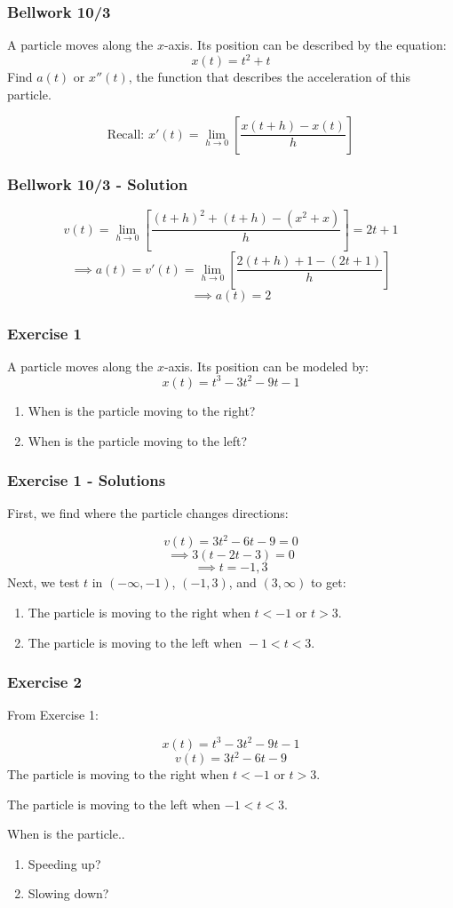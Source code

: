 \documentclass[12pt]{beamer}
\begin{document}
\begin{frame}
	\frametitle{Bellwork 10/3}
	\initclock

	\large
	\vfill
	\vfill
	A particle moves along the $x$-axis. Its position can be described by the equation: \[x(t)=t^2+t\]
	Find $a(t)$ or $x''(t)$, the function that describes the acceleration of this particle.\par
	\vfill
	\[\text{Recall: } x'(t)=\displaystyle\lim_{h\to 0}\left[\frac{x(t+h)-x(t)}{h}\right]\]
	\vfill
	\vfill

	\small
	\crono
\end{frame}
\begin{frame}
	\frametitle{Bellwork 10/3 - Solution}

	\large
	\[v(t)=\displaystyle\lim_{h\to 0}\left[\frac{(t+h)^2+(t+h)-(x^2+x)}{h}\right]=2t+1\]
	\[\implies a(t)=v'(t)=\displaystyle\lim_{h\to 0}\left[\frac{2(t+h)+1-(2t+1)}{h}\right]\]
	\[\implies \boxed{a(t)=2}\]
\end{frame}
\begin{frame}
	\frametitle{Exercise 1}

	\large
	A particle moves along the $x$-axis. Its position can be modeled by: \[x(t)=t^3-3t^2-9t-1\]
	\vfill
	\Large
	\begin{enumerate}\itemsep2ex
		\item When is the particle moving to the right?
		\item When is the particle moving to the left?
	\end{enumerate}
\end{frame}
\begin{frame}
	\frametitle{Exercise 1 - Solutions}

	First, we find where the particle changes directions:\par
	\[v(t)=3t^2-6t-9=0\]
	\[\implies 3(t-2t-3)=0\]
	\[\implies t=-1,3\]
	\vfill
	Next, we test $t$ in $(-\infty, -1)$, $(-1, 3)$, and $(3, \infty)$ to get:\par
	\vfill
	\small
	\begin{enumerate}
		\item The particle is $\boxed{\text{moving to the right when }t<-1\text{ or }t>3}$.
		\item The particle is $\boxed{\text{moving to the left when }-1<t<3}$.
	\end{enumerate}
\end{frame}
\begin{frame}
	\frametitle{Exercise 2}

	From Exercise 1:\par
	\[x(t)=t^3-3t^2-9t-1\]
	\[v(t)=3t^2-6t-9\]
	The particle is moving to the right when $t<-1$ or $t>3$.\par
	The particle is moving to the left when $-1<t<3$.\par
	\vfill
	\vfill
	\large
	When is the particle..\par
	\vfill
	\begin{enumerate}\itemsep2ex
		\item Speeding up?
		\item Slowing down?
	\end{enumerate}
	\vfill
\end{frame}
\end{document}
